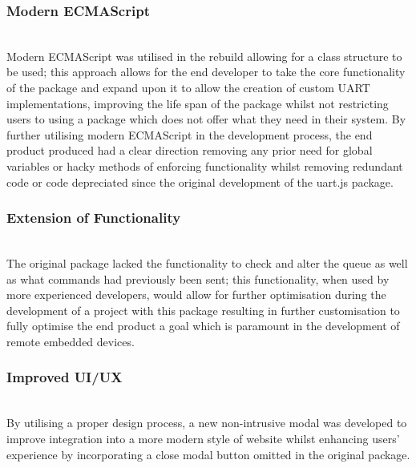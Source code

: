 \documentclass{l4proj}
\begin{document}
\subsubsection{Modern ECMAScript}\hfill\\
Modern ECMAScript was utilised in the rebuild allowing for a class structure to be used; this approach allows for the end developer to take the core functionality of the package and expand upon it to allow the creation of custom UART implementations, improving the life span of the package whilst not restricting users to using a package which does not offer what they need in their system. By further utilising modern ECMAScript in the development process, the end product produced had a clear direction removing any prior need for global variables or hacky methods of enforcing functionality whilst removing redundant code or code depreciated since the original development of the uart.js package.
\\
\subsubsection{Extension of Functionality}\hfill\\
The original package lacked the functionality to check and alter the queue as well as what commands had previously been sent; this functionality, when used by more experienced developers, would allow for further optimisation during the development of a project with this package resulting in further customisation to fully optimise the end product a goal which is paramount in the development of remote embedded devices.
\\ 
\subsubsection{Improved UI/UX}\hfill\\
By utilising a proper design process, a new non-intrusive modal was developed to improve integration into a more modern style of website whilst enhancing users' experience by incorporating a close modal button omitted in the original package.
\end{document}
